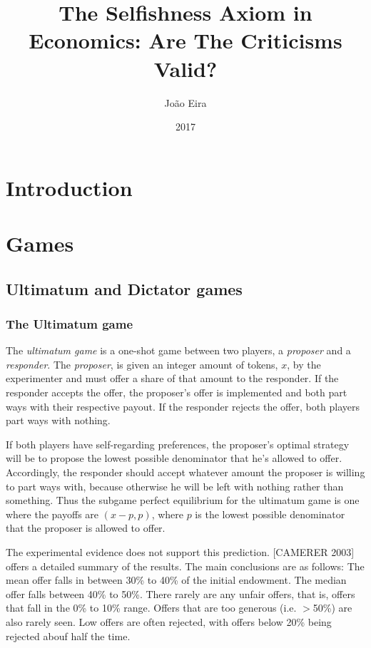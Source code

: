 \message{ !name(tese.tex)}\documentclass{article}
\title{The Selfishness Axiom in Economics: Are The Criticisms Valid?}
\author{João Eira}
\date{2017}
\begin{document}


\maketitle
\tableofcontents
\newpage

\section{Introduction}

\newpage
\section{Games}
\subsection{Ultimatum and Dictator games}
\subsubsection{The Ultimatum game}
The \textit{ultimatum game} is a one-shot game between two players, a \textit{proposer} and a \textit{responder}. The \textit{proposer}, is given an integer amount of tokens, $x$, by the experimenter and must offer a share of that amount to the responder. If the responder accepts the offer, the proposer's offer is implemented and both part ways with their respective payout. If the responder rejects the offer, both players part ways with nothing.

If both players have self-regarding preferences, the proposer's optimal strategy will be to propose the lowest possible denominator that he's allowed to offer. Accordingly, the responder should accept whatever amount the proposer is willing to part ways with, because otherwise he will be left with nothing rather than something. Thus the subgame perfect equilibrium for the ultimatum game is one where the payoffs are $\left(x-p,p \right)$, where $p$ is the lowest possible denominator that the proposer is allowed to offer.

The experimental evidence does not support this prediction. [CAMERER 2003] offers a detailed summary of the results. The main conclusions are as follows: The mean offer falls in between 30\% to 40\% of the initial endowment. The median offer falls between 40\% to 50\%. There rarely are any unfair offers, that is, offers that fall in the 0\% to 10\% range. Offers that are too generous (i.e. $>$50\%) are also rarely seen. Low offers are often rejected, with offers below 20\% being rejected abouf half the time. 
\end{document}
